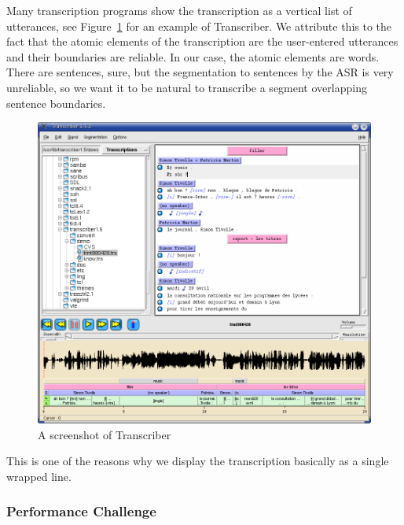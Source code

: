 \documentclass{svproc}
\begin{document}
Many transcription programs show the transcription as a vertical list of
utterances, see Figure~\ref{fig:transcriber1} for an example of
Transcriber. We attribute this to the fact that the atomic elements of
the transcription are the user-entered utterances and their boundaries are
reliable. In our case, the atomic elements are words. There are sentences, sure,
but the segmentation to sentences by the ASR is very unreliable, so we want it
to be natural to transcribe a segment overlapping sentence boundaries.

\begin{figure}[htpb]
\includegraphics[scale=0.4]{rc/transcriber1.png}
\caption{A screenshot of Transcriber}
\label{fig:transcriber1}
\end{figure}

This is one of the reasons why we display the transcription basically as a
single wrapped line.

\subsubsection{Performance Challenge}
\end{document}
